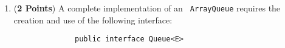 \documentclass[12pt]{article}
\begin{document}
\begin{enumerate}
\begin{enumerate}



          \item ({\bf 2 Points}) A complete implementation of an {\tt
              ArrayQueue} requires the creation and use of the following
            interface:

            \vspace*{-.1in}

            \begin{verbatim}
              public interface Queue<E> 
            \end{verbatim}


\end{enumerate}
\end{enumerate}
\end{document}
